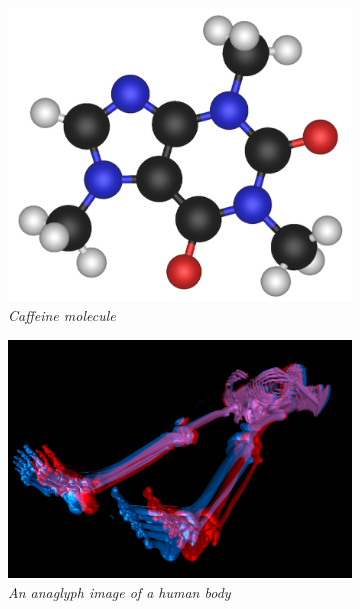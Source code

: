 \begin{figure}[!htb]
\centering

\begin{subfigure}{.5\textwidth}
  \centering
  \includegraphics[scale=.20]{molecule.png}
  \caption{\emph{Caffeine molecule}}
\end{subfigure}%
\begin{subfigure}{.5\textwidth}
  \centering
  \includegraphics[scale=.20]{medicalvis.png}
  \caption{\emph{An anaglyph image of a human body} }
\end{subfigure}
\begin{subfigure}{.5\textwidth}
  \centering

\end{subfigure}
\end{figure}
